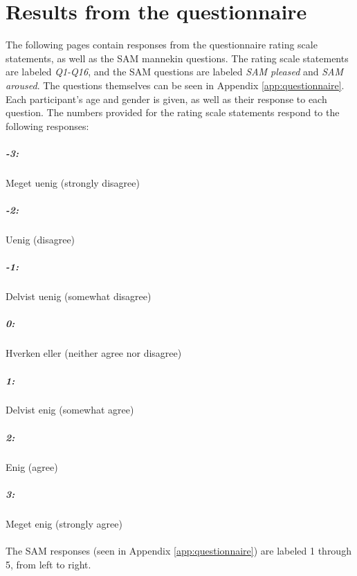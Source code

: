 \chapter{Results from the questionnaire}\label{app:questionnaire_results}
The following pages contain responses from the questionnaire rating scale statements, as well as the SAM mannekin questions. The rating scale statements are labeled \textit{Q1-Q16}, and the SAM questions are labeled \textit{SAM pleased} and \textit{SAM aroused}. The questions themselves can be seen in Appendix \ref{app:questionnaire}. Each participant's age and gender is given, as well as their response to each question. The numbers provided for the rating scale statements respond to the following responses:

\paragraph{-3:} Meget uenig (strongly disagree)
\paragraph{-2:} Uenig (disagree)
\paragraph{-1:} Delvist uenig (somewhat disagree)
\paragraph{0:} Hverken eller (neither agree nor disagree)
\paragraph{1:} Delvist enig (somewhat agree)
\paragraph{2:} Enig (agree)
\paragraph{3:} Meget enig (strongly agree)\\
\\
The SAM responses (seen in Appendix \ref{app:questionnaire}) are labeled 1 through 5, from left to right.

